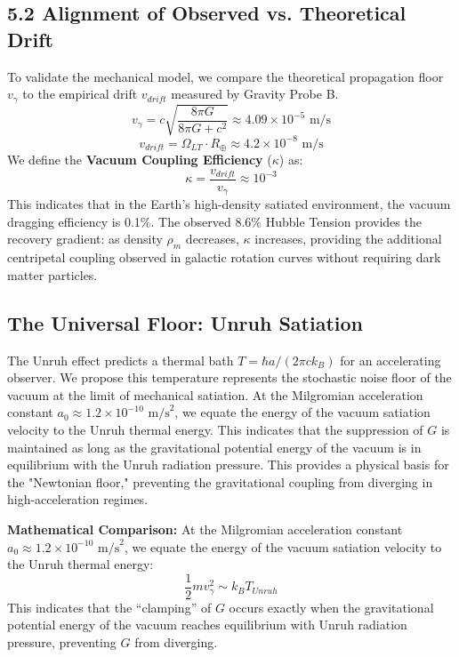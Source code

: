 \documentclass[12pt,a4paper]{article}
\begin{document}
\subsection{5.2 Alignment of Observed vs. Theoretical Drift}
To validate the mechanical model, we compare the theoretical propagation floor $v_{\gamma}$ to the empirical drift $v_{drift}$ measured by Gravity Probe B.
\begin{equation}
v_{\gamma} = c \sqrt{\displaystyle\frac{8\pi G}{8\pi G + c^2}} \approx 4.09 \times 10^{-5} \text{ m/s}
\end{equation}
\begin{equation}
v_{drift} = \Omega_{LT} \cdot R_{\oplus} \approx 4.2 \times 10^{-8} \text{ m/s}
\end{equation}
We define the \textbf{Vacuum Coupling Efficiency} ($\kappa$) as:
\begin{equation}
\kappa = \frac{v_{drift}}{v_{\gamma}} \approx 10^{-3}
\end{equation}
This indicates that in the Earth's high-density satiated environment, the vacuum dragging efficiency is 0.1\%. The observed 8.6\% Hubble Tension provides the recovery gradient: as density $\rho_m$ decreases, $\kappa$ increases, providing the additional centripetal coupling observed in galactic rotation curves without requiring dark matter particles.

\subsection{The Universal Floor: Unruh Satiation}
The Unruh effect predicts a thermal bath $T = \hbar a / (2\pi c k_B)$ for an accelerating observer. We propose this temperature represents the stochastic noise floor of the vacuum at the limit of mechanical satiation. At the Milgromian acceleration constant $a_0 \approx 1.2 \times 10^{-10} \text{ m/s}^2$, we equate the energy of the vacuum satiation velocity to the Unruh thermal energy. This indicates that the suppression of $G$ is maintained as long as the gravitational potential energy of the vacuum is in equilibrium with the Unruh radiation pressure. This provides a physical basis for the "Newtonian floor," preventing the gravitational coupling from diverging in high-acceleration regimes.

\textbf{Mathematical Comparison:}
At the Milgromian acceleration constant $a_0 \approx 1.2 \times 10^{-10} \text{ m/s}^2$, we equate the energy of the vacuum satiation velocity to the Unruh thermal energy:
\begin{equation}
\frac{1}{2} m v_{\gamma}^2 \sim k_B T_{Unruh}
\end{equation}
This indicates that the ``clamping'' of $G$ occurs exactly when the gravitational potential energy of the vacuum reaches equilibrium with Unruh radiation pressure, preventing $G$ from diverging.
\end{document}
